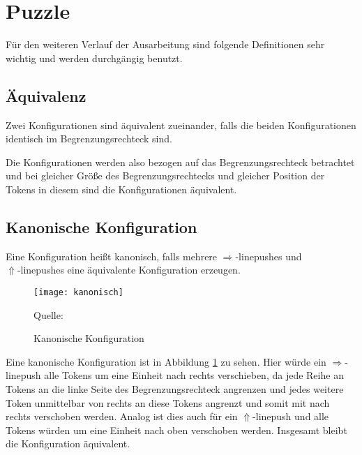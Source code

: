 \documentclass[seminar,german]{algothesis}
\newcommand*{\quelle}{%
  \footnotesize Quelle:
}
\begin{document}
\section{Puzzle}
Für den weiteren Verlauf der Ausarbeitung sind folgende Definitionen sehr wichtig und werden durchgängig benutzt.

\subsection{Äquivalenz}
\begin{definition}
Zwei Konfigurationen sind äquivalent zueinander, falls die beiden Konfigurationen identisch im Begrenzungsrechteck sind. 
\end{definition}
\noindent Die Konfigurationen werden also bezogen auf das Begrenzungsrechteck betrachtet und bei gleicher Größe des Begrenzungsrechtecks und gleicher Position der Tokens in diesem sind die Konfigurationen äquivalent.


\subsection{Kanonische Konfiguration}
\begin{definition}
Eine Konfiguration heißt kanonisch, falls mehrere $\Rightarrow$-linepushes und \\$\Uparrow$-linepushes eine äquivalente Konfiguration erzeugen.
\end{definition}

\begin{figure}[ht]
	\centering
	\texttt{[image: kanonisch]}
	\caption{Kanonische Konfiguration}
	\quelle \cite{akitaya2022pushing}
	\label{fig:3}
\end{figure}

\noindent Eine kanonische Konfiguration ist in Abbildung \ref{fig:3} zu sehen. Hier würde ein $\Rightarrow$-linepush alle Tokens um eine Einheit nach rechts verschieben, da jede Reihe an Tokens an die linke Seite des Begrenzungsrechteck angrenzen und jedes weitere Token unmittelbar von rechts an diese Tokens angrenzt und somit mit nach rechts verschoben werden. Analog ist dies auch für ein $\Uparrow$-linepush und alle Tokens würden um eine Einheit nach oben verschoben werden. Insgesamt bleibt die Konfiguration äquivalent.
\end{document}
